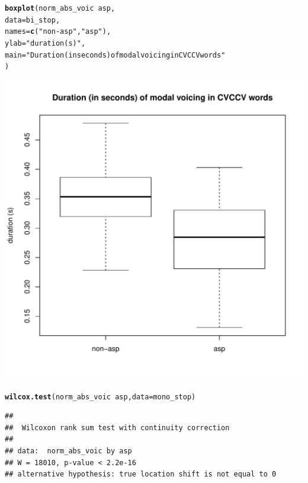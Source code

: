 \documentclass[a4paper,11pt]{article}\usepackage[]{graphicx}\usepackage[]{color}
\makeatletter
\def\maxwidth{ %
  \ifdim\Gin@nat@width>\linewidth
    \linewidth
  \else
    \Gin@nat@width
  \fi
}
\newcommand{\hlstr}[1]{\textcolor[rgb]{0.192,0.494,0.8}{#1}}%
\newcommand{\hlopt}[1]{\textcolor[rgb]{0,0,0}{#1}}%
\newcommand{\hlstd}[1]{\textcolor[rgb]{0.345,0.345,0.345}{#1}}%
\newcommand{\hlkwc}[1]{\textcolor[rgb]{0.333,0.667,0.333}{#1}}%
\newcommand{\hlkwd}[1]{\textcolor[rgb]{0.737,0.353,0.396}{\textbf{#1}}}%
\newenvironment{kframe}{%
 \def\at@end@of@kframe{}%
 \ifinner\ifhmode%
  \def\at@end@of@kframe{\end{minipage}}%
  \begin{minipage}{\columnwidth}%
 \fi\fi%
 \def\FrameCommand##1{\hskip\@totalleftmargin \hskip-\fboxsep
 \colorbox{shadecolor}{##1}\hskip-\fboxsep
     \hskip-\linewidth \hskip-\@totalleftmargin \hskip\columnwidth}%
 \MakeFramed {\advance\hsize-\width
   \@totalleftmargin\z@ \linewidth\hsize
   \@setminipage}}%
 {\par\unskip\endMakeFramed%
 \at@end@of@kframe}
\newenvironment{knitrout}{}{} %
\makeatother
\begin{document}
\begin{knitrout}
\color{fgcolor}\begin{kframe}
\begin{alltt}
\hlkwd{boxplot}\hlstd{(norm_abs_voic} \hlopt{~} \hlstd{asp,}
        \hlkwc{data} \hlstd{= bi_stop,}
        \hlkwc{names} \hlstd{=} \hlkwd{c}\hlstd{(}\hlstr{"non-asp"}\hlstd{,} \hlstr{"asp"}\hlstd{),}
        \hlkwc{ylab} \hlstd{=} \hlstr{"duration (s)"}\hlstd{,}
        \hlkwc{main} \hlstd{=} \hlstr{"Duration (in seconds) of modal voicing in CVCCV words"}
        \hlstd{)}
\end{alltt}
\end{kframe}

{\centering \includegraphics[width=\maxwidth]{img/bi-stop-box-1} 

}



\end{knitrout}

\begin{knitrout}
\color{fgcolor}\begin{kframe}
\begin{alltt}
\hlkwd{wilcox.test}\hlstd{(norm_abs_voic} \hlopt{~} \hlstd{asp,} \hlkwc{data} \hlstd{= mono_stop)}
\end{alltt}
\begin{verbatim}
## 
## 	Wilcoxon rank sum test with continuity correction
## 
## data:  norm_abs_voic by asp
## W = 18010, p-value < 2.2e-16
## alternative hypothesis: true location shift is not equal to 0
\end{verbatim}
\end{kframe}
\end{knitrout}
\end{document}
